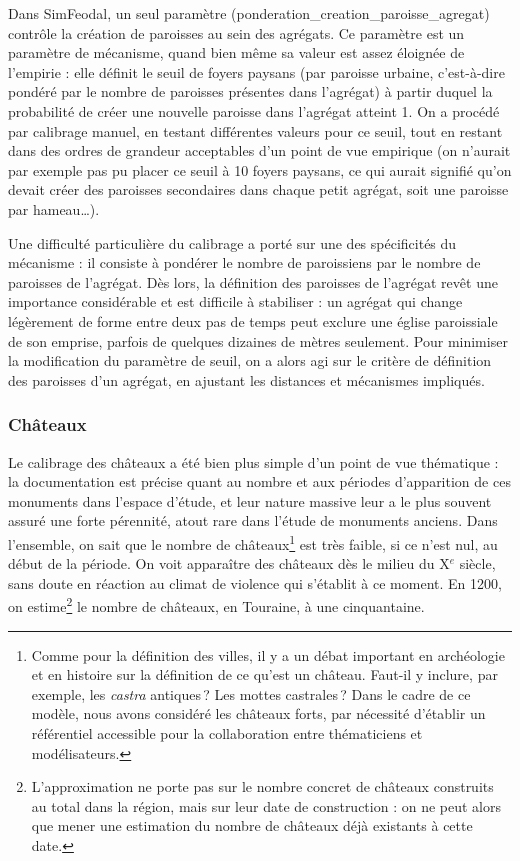 Dans SimFeodal, un seul paramètre (\textsf{ponderation\_creation\_paroisse\_agregat}) contrôle la création de paroisses au sein des agrégats.
Ce paramètre est un \og paramètre de mécanisme\fg{}, quand bien même sa valeur est assez éloignée de l'empirie : elle définit le seuil de foyers paysans (par paroisse urbaine, c'est-à-dire pondéré par le nombre de paroisses présentes dans l'agrégat) à partir duquel la probabilité de créer une nouvelle paroisse dans l'agrégat atteint 1.
On a procédé par calibrage manuel, en testant différentes valeurs pour ce seuil, tout en restant dans des ordres de grandeur acceptables d'un point de vue empirique (on n'aurait par exemple pas pu placer ce seuil à 10 foyers paysans, ce qui aurait signifié qu'on devait créer des paroisses secondaires dans chaque petit agrégat, soit une paroisse par hameau\ldots).

Une difficulté particulière du calibrage a porté sur une des spécificités du mécanisme : il consiste à pondérer le nombre de paroissiens par le nombre de paroisses de l'agrégat.
Dès lors, la définition des \og paroisses de l'agrégat\fg{} revêt une importance considérable et est difficile à stabiliser : un agrégat qui change légèrement de forme entre deux pas de temps peut \og exclure\fg{} une église paroissiale de son emprise, parfois de quelques dizaines de mètres seulement.
Pour minimiser la modification du paramètre de seuil, on a alors agi sur le critère de définition des paroisses d'un agrégat, en ajustant les distances et mécanismes impliqués.


\subsubsection*{Châteaux \label{subsubsec:calibrage-chateaux}}

Le calibrage des châteaux a été bien plus simple d'un point de vue thématique : la documentation est précise quant au nombre et aux périodes d'apparition de ces monuments dans l'espace d'étude, et leur nature massive leur a le plus souvent assuré une forte pérennité, atout rare dans l'étude de monuments anciens.
Dans l'ensemble, on sait que le nombre de châteaux\footnote{
	Comme pour la définition des villes, il y a un débat important en archéologie et en histoire sur la définition de ce qu'est un château. Faut-il y inclure, par exemple, les \textit{castra} antiques ? Les mottes castrales ? Dans le cadre de ce modèle, nous avons considéré les \og châteaux forts\fg{}, par nécessité d'établir un référentiel accessible pour la collaboration entre thématiciens et modélisateurs.
} est très faible, si ce n'est nul, au début de la période.
On voit apparaître des châteaux dès le milieu du X$^e$ siècle, sans doute en réaction au climat de violence qui s'établit à ce moment.
En 1200, on estime\footnote{
	L'approximation ne porte pas sur le nombre concret de châteaux construits au total dans la région, mais sur leur date de construction : on ne peut alors que mener une estimation du nombre de châteaux déjà existants à cette date.
} le nombre de châteaux, en Touraine, à une cinquantaine.

